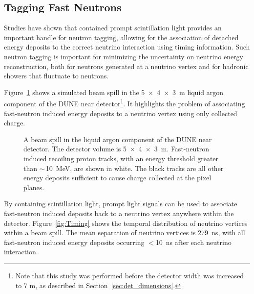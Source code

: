 \subsection{Tagging Fast Neutrons}

Studies have shown that contained prompt scintillation light provides an important handle for neutron tagging, allowing for the association of detached energy deposits to the correct neutrino interaction using timing information. Such neutron tagging is important for minimizing the uncertainty on neutrino energy reconstruction, both for neutrons generated at a neutrino vertex and for hadronic showers that fluctuate to neutrons. 

Figure~\ref{fig:NDSpill} shows a simulated beam spill in the \SI[product-units=repeat]{5x4x3}{\metre} liquid argon component of the DUNE near detector\footnote{Note that this study was performed before the detector width was increased to 7 m, as described in Section~\ref{sec:det_dimensions}.}. 
It highlights the problem of associating fast-neutron induced energy deposits to a neutrino vertex using only collected charge.  

\begin{figure}[htb]
	\caption{A beam spill in the liquid argon component of the DUNE near detector. 
		The detector volume is \SI[product-units=repeat]{5x4x3}{\metre}.
		Fast-neutron induced recoiling proton tracks, with an energy threshold greater than $\sim\,$\SI{10}{\mega\electronvolt}, are shown in white.
		The black tracks are all other energy deposits sufficient to cause charge collected at the pixel planes.}
	\label{fig:NDSpill}
\end{figure}

By containing scintillation light, prompt light signals can be used to associate fast-neutron induced deposits back to a neutrino vertex anywhere within the detector.
Figure~\ref{fig:Timing} shows the temporal distribution of neutrino vertices within a beam spill.
The mean separation of neutrino vertices is \SI{279}{\nano\second}, with all fast-neutron induced energy deposits occurring $<$\SI{10}{\nano\second} after each neutrino interaction.      

